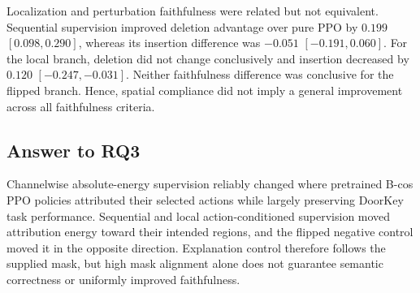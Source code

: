 Localization and perturbation faithfulness were related but not equivalent.
Sequential supervision improved deletion advantage over pure PPO by $0.199$
$[0.098,0.290]$, whereas its insertion difference was $-0.051$
$[-0.191,0.060]$. For the local branch, deletion did not change conclusively and
insertion decreased by $0.120$ $[-0.247,-0.031]$. Neither faithfulness difference
was conclusive for the flipped branch. Hence, spatial compliance did not imply a
general improvement across all faithfulness criteria.

\subsection{Answer to RQ3}

Channelwise absolute-energy supervision reliably changed where pretrained B-cos PPO
policies attributed their selected actions while largely preserving DoorKey task
performance. Sequential and local action-conditioned supervision moved attribution
energy toward their intended regions, and the flipped negative control moved it in
the opposite direction. Explanation control therefore follows the supplied mask, but high mask
alignment alone does not guarantee semantic correctness or uniformly improved
faithfulness.
